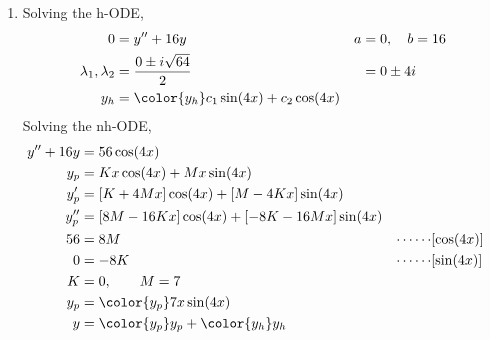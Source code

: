 \begin{enumerate}
    \item Solving the h-ODE,
          \begin{align}
              0                        & = y'' + 16y                                 &
              a                        & = 0, \quad b = 16                             \\
              \lambda_{1}, \lambda_{2} & = \frac{0 \pm i\sqrt{64}}{2}                &
                                       & = 0 \pm 4i                                    \\
              y_{h}                    & = \color{y_h} c_{1}\sin(4x) + c_{2}\cos(4x)
          \end{align}
          Solving the nh-ODE,
          \begin{align}
              y'' + 16y    & = 56\cos(4x)                                     \\
              y_{p}        & = Kx \cos(4x) + Mx \sin(4x)                      \\
              y_{p}'       & = [K + 4Mx] \cos(4x) + [M - 4Kx] \sin(4x)        \\
              y_{p}''      & = [8M - 16Kx] \cos(4x) + [-8K - 16Mx] \sin(4x)   \\
              56           & = 8M                                           &
              \cdots\cdots & [\cos(4x)]                                       \\
              0            & = -8K                                          &
              \cdots\cdots & [\sin(4x)]                                       \\
              K            & = 0, \qquad M = 7                                \\
              y_{p}        & = \color{y_p} 7x \sin(4x)                        \\
              y            & = {\color{y_p} y_{p}} + {\color{y_h} y_{h}}
          \end{align}


\end{enumerate}
